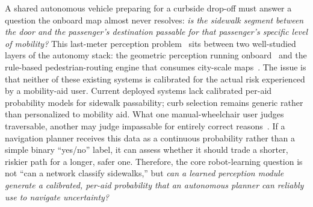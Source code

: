 \documentclass{article}
\begin{document}
A shared autonomous vehicle preparing for a curbside drop-off must answer a question the onboard map almost never resolves: \emph{is the sidewalk segment between the door and the passenger's destination passable for that passenger's specific level of mobility?} This last-meter perception problem~\citep{bolten2017accessmap,saha2022mypath,tannert2018wheelchair} sits between two well-studied layers of the autonomy stack: the geometric perception running onboard~\citep{Saha_ProjectSidewalk_CHI2019,o'meara2025rampnet,hosseini2023tile2net} and the rule-based pedestrian-routing engine that consumes city-scale maps~\citep{openrouteservice2026wheelchair,bolten2019opensidewalks}. The issue is that neither of these existing systems is calibrated for the actual risk experienced by a mobility-aid user. Current deployed systems lack calibrated per-aid probability models for sidewalk passability; curb selection remains generic rather than personalized to mobility aid. What one manual-wheelchair user judges traversable, another may judge impassable for entirely correct reasons~\citep{DBLP:journals/corr/abs-2502-19888}. If a navigation planner receives this data as a continuous probability rather than a simple binary ``yes/no'' label, it can assess whether it should trade a shorter, riskier path for a longer, safer one. Therefore, the core robot-learning question is not ``can a network classify sidewalks,'' but \emph{can a learned perception module generate a calibrated, per-aid probability that an autonomous planner can reliably use to navigate uncertainty?}
\end{document}
